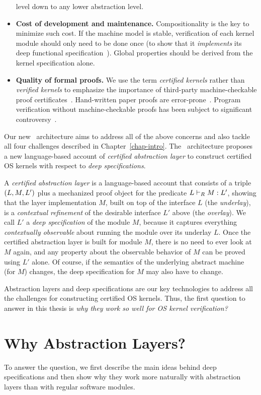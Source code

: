 \begin{itemize}
  level down to any lower abstraction level.
\item {\bf Cost of development and maintenance.} Compositionality
  is the key to minimize such cost. If the machine model is stable,
  verification of each kernel module should only need
  to be done once (to show that it {\em implements} its deep
  functional specification~\cite{dscal15}). Global properties should
  be derived from the kernel specification alone. 
\item {\bf Quality of formal proofs.} We use the term {\em certified
  kernels} rather than {\em verified kernels} to emphasize
  the importance of third-party machine-checkable proof
  certificates~\cite{shao10}. Hand-written paper proofs are
  error-prone~\cite{findler12}. Program verification without
  machine-checkable proofs has been subject to significant
  controversy~\cite{demillo77}.
\end{itemize}


Our new \CTOS\ architecture aims to address all of the above concerns
and also tackle all four challenges described in Chapter~\ref{chap-intro}.
The \CTOS\ architecture 
proposes a new language-based account of 
\emph{certified abstraction layer}
to construct certified OS kernels with respect to \emph{deep specifications}.

A {\em certified abstraction layer} is a language-based account that
consists of a triple $(L,M,L')$ plus a mechanized proof
object for the predicate $L \vdash_{R} M : L'$,
showing that the layer implementation $M$, built on top of the
interface $L$ (the {\em underlay}), is a {\em contextual refinement}
of the desirable interface $L'$ above (the {\em overlay}). 
We call $L'$ 
a 
\emph{deep
specification} of the module $M$, because it captures
everything {\em contextually observable} about running the module over
its underlay  $L$. Once the certified abstraction layer
is built for module  $M$, there is no need to ever look at $M$
again, and any property about the observable behavior of $M$ can be proved using $L'$ alone. Of
course, if the semantics of the underlying abstract machine (for $M$)
changes, the deep specification for $M$ may also have to change.

Abstraction layers and deep specifications
are our key technologies to address all the challenges 
for constructing certified OS kernels.
Thus, the first question to answer in this thesis
is \emph{why they  work so well for OS kernel verification?}


\section{Why Abstraction Layers?}
\label{sec:overview:why}
To answer the question,
we first describe the main ideas behind deep
specifications and then show why they work more naturally with
abstraction layers than with regular software modules.

